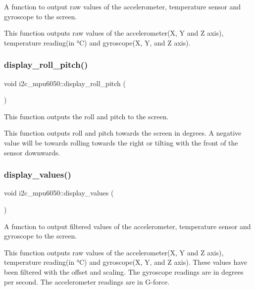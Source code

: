 A function to output raw values of the accelerometer, temperature sensor and gyroscope to the screen. 

This function outputs raw values of the accelerometer(\+X, Y and Z axis), temperature reading(in °C) and gyroscope(\+X, Y, and Z axis). \mbox{\label{classi2c__mpu6050_ab416fccb252bc742b84416ae78e48f58}} 
\subsubsection{\texorpdfstring{display\+\_\+roll\+\_\+pitch()}{display\_roll\_pitch()}}
{\footnotesize\ttfamily void i2c\+\_\+mpu6050\+::display\+\_\+roll\+\_\+pitch (\begin{DoxyParamCaption}{ }\end{DoxyParamCaption})}



This function outputs the roll and pitch to the screen. 

This function outputs roll and pitch towards the screen in degrees. A negative value will be towards rolling towards the right or tilting with the front of the sensor downwards.  \mbox{\label{classi2c__mpu6050_ac5035930b0bc113e67c2838e17ae1460}} 
\subsubsection{\texorpdfstring{display\+\_\+values()}{display\_values()}}
{\footnotesize\ttfamily void i2c\+\_\+mpu6050\+::display\+\_\+values (\begin{DoxyParamCaption}{ }\end{DoxyParamCaption})}



A function to output filtered values of the accelerometer, temperature sensor and gyroscope to the screen. 

This function outputs raw values of the accelerometer(\+X, Y and Z axis), temperature reading(in °C) and gyroscope(\+X, Y, and Z axis). These values have been filtered with the offset and scaling. The gyroscope readings are in degrees per second. The accelerometer readings are in G-\/force.  \mbox{\label{classi2c__mpu6050_a2c5020be3e7dda0123748577ce3346f5}} 
